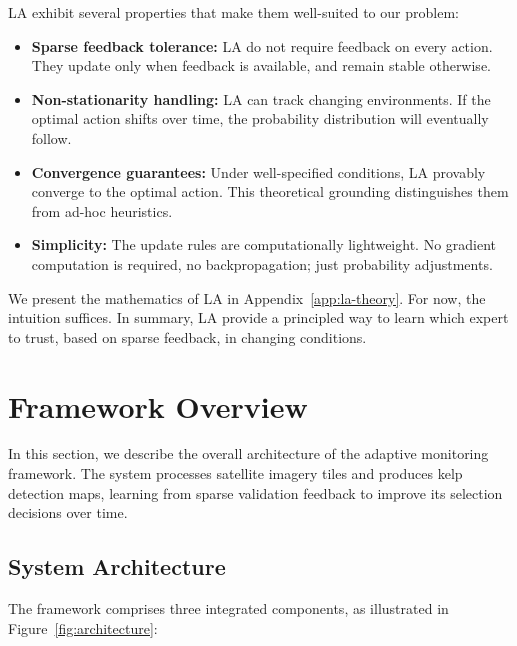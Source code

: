 \documentclass[11pt,a4paper]{article}
\begin{document}
LA exhibit several properties that make them well-suited to our problem:

\begin{itemize}[noitemsep]
    \item \textbf{Sparse feedback tolerance:} LA do not require feedback on every action. They update only when feedback is available, and remain stable otherwise.

    \item \textbf{Non-stationarity handling:} LA can track changing environments. If the optimal action shifts over time, the probability distribution will eventually follow.

    \item \textbf{Convergence guarantees:} Under well-specified conditions, LA provably converge to the optimal action. This theoretical grounding distinguishes them from ad-hoc heuristics.

    \item \textbf{Simplicity:} The update rules are computationally lightweight. No gradient computation is required, no backpropagation; just probability adjustments.
\end{itemize}

We present the mathematics of LA in Appendix~\ref{app:la-theory}. For now, the intuition suffices. In summary, LA provide a principled way to learn which expert to trust, based on sparse feedback, in changing conditions.


\section{Framework Overview}
\label{sec:overview}

In this section, we describe the overall architecture of the adaptive monitoring framework. The system processes satellite imagery tiles and produces kelp detection maps, learning from sparse validation feedback to improve its selection decisions over time.

\subsection{System Architecture}

The framework comprises three integrated components, as illustrated in Figure~\ref{fig:architecture}:
\end{document}
